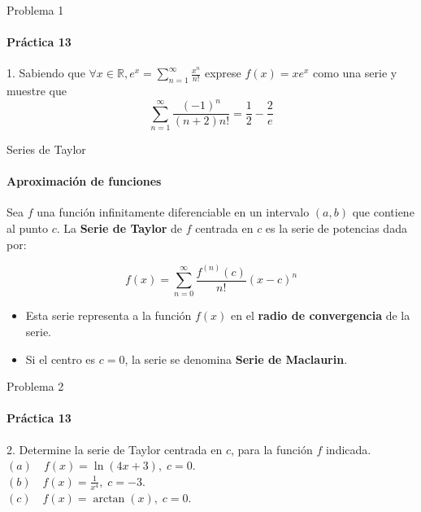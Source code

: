 \documentclass{plantillaPPT}
\begin{document}
\primeraDiapo

\begin{frame}{Problema 1}
\framesubtitle{Práctica 13}

    1. Sabiendo que $\displaystyle \forall x\in\mathbb{R}, e^x = \sum_{n=1}^\infty \frac{x^n}{n!}$ exprese $f(x) = xe^x$ como una serie y muestre que
    \begin{equation*}
        \sum_{n=1}^\infty \frac{(-1)^n}{(n+2)n!} = \frac{1}{2}-\frac{2}{e}
    \end{equation*}
\end{frame}

\begin{frame}{Series de Taylor}
\framesubtitle{Aproximación de funciones}

\begin{definicion}
    Sea \(f\) una función infinitamente diferenciable en un intervalo \((a, b)\) que contiene al punto \(c\).
    La \textbf{Serie de Taylor} de \(f\) centrada en \(c\) es la serie de potencias dada por:
\end{definicion}

\begin{equation*}
f(x) = \sum_{n=0}^{\infty} \frac{f^{(n)}(c)}{n!}(x-c)^n
\end{equation*}

\begin{itemize}
    \item Esta serie representa a la función \(f(x)\) en el \textbf{radio de convergencia} de la serie.
    \item Si el centro es \(c=0\), la serie se denomina \textbf{Serie de Maclaurin}.
\end{itemize}

\end{frame}

\begin{frame}{Problema 2}
    \framesubtitle{Práctica 13}
    
    2. Determine la serie de Taylor centrada en $c$, para la función $f$ indicada.\\[15pt]
    $(a)\quad f(x)=\ln(4x+3),\; c=0$.\\
    $(b)\quad f(x) = \frac{1}{x^4},\; c=-3$. \\
    $(c)\quad f(x) = \arctan(x),\; c=0$.
\end{frame}
\end{document}
